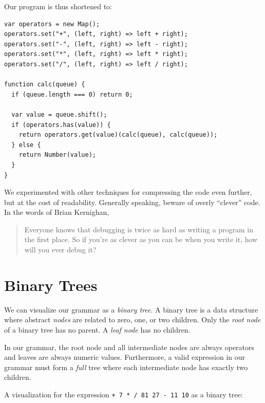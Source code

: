 \documentclass{book}
\begin{document}
Our program is thus shortened to:

\begin{lstlisting}
var operators = new Map();
operators.set("+", (left, right) => left + right);
operators.set("-", (left, right) => left - right);
operators.set("*", (left, right) => left * right);
operators.set("/", (left, right) => left / right);

function calc(queue) {
  if (queue.length === 0) return 0;

  var value = queue.shift();
  if (operators.has(value)) {
    return operators.get(value)(calc(queue), calc(queue));
  } else {
    return Number(value);
  }
}
\end{lstlisting}

We experimented with other techniques for compressing the code even further, but at the cost of readability. Generally speaking, beware of overly ``clever'' code. In the words of Brian Kernighan, 

\begin{quote}
Everyone knows that debugging is twice as hard as writing a program in the first place. So if you're as clever as you can be when you write it, how will you ever debug it?
\end{quote}

\section{Binary Trees}

We can visualize our grammar as a \textit{binary tree}. A binary tree is a data structure where abstract \textit{nodes} are related to zero, one, or two children. Only the \textit{root node} of a binary tree has no parent. A \textit{leaf node} has no children.

In our grammar, the root node and all intermediate nodes are always operators and leaves are always numeric values. Furthermore, a valid expression in our grammar must form a \textit{full} tree where each intermediate node has exactly two children.

A visualization for the expression \texttt{+ 7 * / 81 27 - 11 10} as a binary tree:
\end{document}
